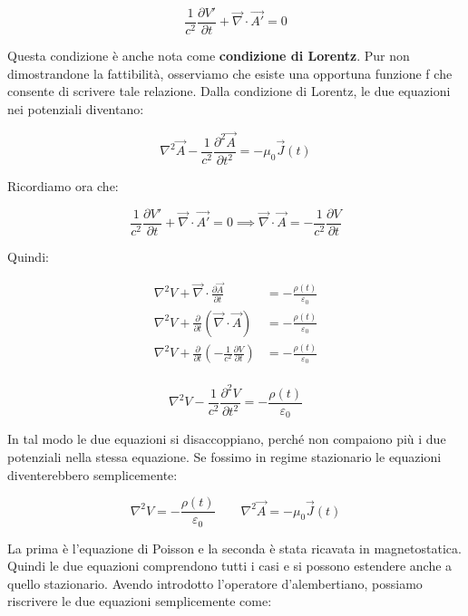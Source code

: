 \[
	\boxed{\frac{1}{c^2}\frac{\partial V'}{\partial t} + \vec{\nabla} \cdot \vec{A'} = 0}
\]

Questa condizione è anche nota come \textbf{condizione di Lorentz}. Pur non dimostrandone la fattibilità, osserviamo che esiste una opportuna funzione f che consente di scrivere tale relazione. Dalla condizione di Lorentz, le due equazioni nei potenziali diventano:

\begin{equation}
	\boxed{\nabla^2 \vec{A} -\frac{1}{c^2}\frac{\partial^2 \vec{A}}{\partial t^2} = -\mu_0 \vec{J} (t)}
\end{equation}

Ricordiamo ora che:

\[
	\frac{1}{c^2}\frac{\partial V'}{\partial t} + \vec{\nabla} \cdot \vec{A'} = 0 \implies  \vec{\nabla} \cdot \vec{A} = - \frac{1}{c^2}\frac{\partial V}{\partial t}
\]

Quindi:

\begin{equation*}
	\begin{aligned}
		\nabla^2 V + \vec{\nabla} \cdot \frac{\partial \vec{A}}{\partial t} &= -\frac{\rho (t)}{\varepsilon_0} \\
		\nabla^2 V + \frac{\partial}{\partial t} (\vec{\nabla} \cdot \vec{A}) &= -\frac{\rho (t)}{\varepsilon_0} \\
		\nabla^2 V + \frac{\partial}{\partial t} \left( - \frac{1}{c^2}\frac{\partial V}{\partial t} \right)   &= -\frac{\rho (t)}{\varepsilon_0} \\
	\end{aligned}
\end{equation*}

\begin{equation}
	\boxed{\nabla^2 V  - \frac{1}{c^2}\frac{\partial^2 V}{\partial t^2} = -\frac{\rho (t)}{\varepsilon_0}}
\end{equation}

In tal modo le due equazioni si disaccoppiano, perché non compaiono più i due potenziali nella stessa equazione. Se fossimo in regime stazionario le equazioni diventerebbero semplicemente:

\[
	\nabla^2 V  = -\frac{\rho (t)}{\varepsilon_0} \qquad \nabla^2 \vec{A} = -\mu_0 \vec{J} (t)
\]

La prima è l'equazione di Poisson e la seconda è stata ricavata in magnetostatica. Quindi le due equazioni comprendono tutti i casi e si possono estendere anche a quello stazionario. Avendo introdotto l'operatore d'alembertiano, possiamo riscrivere le due equazioni semplicemente come:

